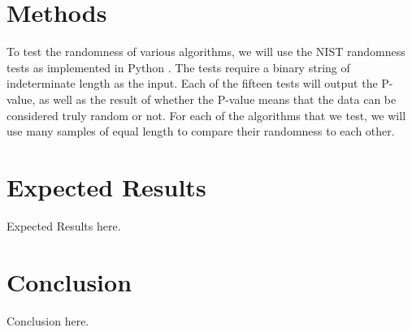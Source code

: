 \documentclass[11pt,letterpaper,conference]{IEEEtran}
\begin{document}
\section{Methods}
To test the randomness of various algorithms, we will use the NIST randomness tests as
implemented in Python \cite{rtestsuite}. The tests require a binary string of indeterminate length as the input.
Each of the fifteen tests will output the P-value, as well as the result of whether the P-value means
that the data can be considered truly random or not. For each of the algorithms that we test, we
will use many samples of equal length to compare their randomness to each other.

\section{Expected Results}
Expected Results here.

\section{Conclusion}
Conclusion here.

\printbibliography[heading=bibintoc, title={References}]
\end{document}
